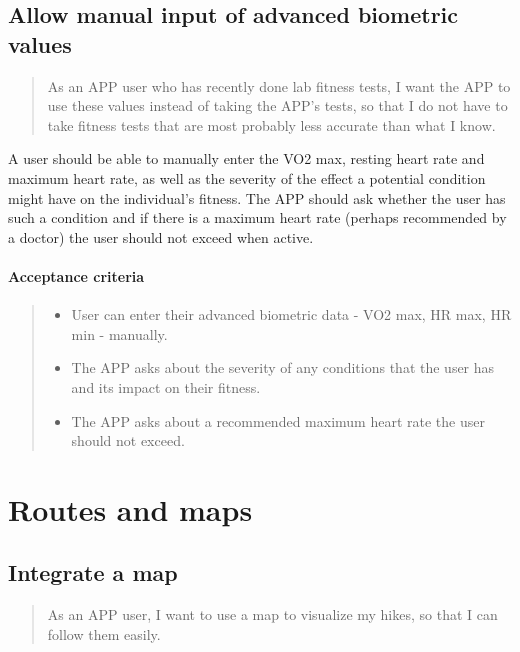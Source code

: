 \subsection{Allow manual input of advanced biometric values}\label{US:manual-advanced}
\begin{quote}
As an APP user who has recently done lab fitness tests, I want the APP to use these values instead of taking the APP's tests, so that I do not have to take fitness tests that are most probably less accurate than what I know.
\end{quote}

A user should be able to manually enter the VO2 max, resting heart rate and maximum heart rate, as well as the severity of the effect a potential condition might have on the individual's fitness.
The APP should ask whether the user has such a condition and if there is a maximum heart rate (perhaps recommended by a doctor) the user should not exceed when active.

\paragraph*{Acceptance criteria}
\begin{quote}
\begin{itemize}
    \item User can enter their advanced biometric data - VO2 max, HR max, HR min - manually.
    \item The APP asks about the severity of any conditions that the user has and its impact on their fitness.
    \item The APP asks about a recommended maximum heart rate the user should not exceed.
\end{itemize}
\end{quote}


\section{Routes and maps}\label{epic:map}

\subsection{Integrate a map}\label{US:map-integrate}
\begin{quote}
As an APP user, I want to use a map to visualize my hikes, so that I can follow them easily.
\end{quote}

